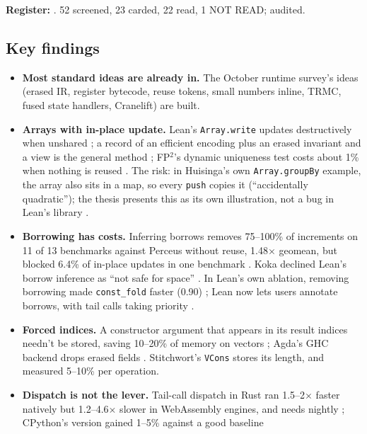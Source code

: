 \documentclass[11pt,a4paper]{article}
\newcommand{\code}[1]{\texttt{#1}}
\newcommand{\file}[1]{\path{#1}}
\begin{document}
\textbf{Register:} \file{docs/research/compilation.md}. 52 screened, 23 carded, 22 read, 1 NOT READ;
audited.

\subsection{Key findings}
\begin{itemize}
  \item \textbf{Most standard ideas are already in.} The October runtime survey's ideas
    (erased IR, register bytecode, reuse tokens, small numbers inline, TRMC, fused state
    handlers, Cranelift) are built.
  \item \textbf{Arrays with in-place update.} Lean's \code{Array.write} updates destructively
    when unshared \cite{ullrich2019beans}; a record of an efficient encoding plus an erased
    invariant and a view is the general method \cite{allais2023builtin}; FP$^2$'s dynamic
    uniqueness test costs about 1\% when nothing is reused \cite{lorenzen2023fp2}. The risk:
    in Huisinga's own \code{Array.groupBy} example, the array also sits in a map, so every
    \code{push} copies it (``accidentally quadratic''); the thesis presents this as its own
    illustration, not a bug in Lean's library \cite{huisinga2023uniqueness}.
  \item \textbf{Borrowing has costs.} Inferring borrows removes 75--100\% of increments on 11 of
    13 benchmarks against Perceus without reuse, 1.48$\times$ geomean, but blocked 6.4\% of
    in-place updates in one benchmark \cite{brandon2026borrows}. Koka declined Lean's borrow
    inference as ``not safe for space'' \cite{lorenzen2022frame}. In Lean's own ablation,
    removing borrowing made \code{const\_fold} faster (0.90) \cite{ullrich2019beans}; Lean now
    lets users annotate borrows, with tail calls taking priority \cite{leanreleases,leaninferborrow}.
  \item \textbf{Forced indices.} A constructor argument that appears in its result indices
    needn't be stored, saving 10--20\% of memory on vectors \cite{brady2004indices}; Agda's GHC
    backend drops erased fields \cite{agdaruntimeirrelevance}. Stitchwort's \code{VCons} stores
    its length, and \file{vec.md} measured 5--10\% per operation.
  \item \textbf{Dispatch is not the lever.} Tail-call dispatch in Rust ran 1.5--2$\times$ faster
    natively but 1.2--4.6$\times$ slower in WebAssembly engines, and needs nightly
    \cite{keeter2026tailcall}; CPython's version gained 1--5\% against a good baseline

\end{itemize}
\end{document}
